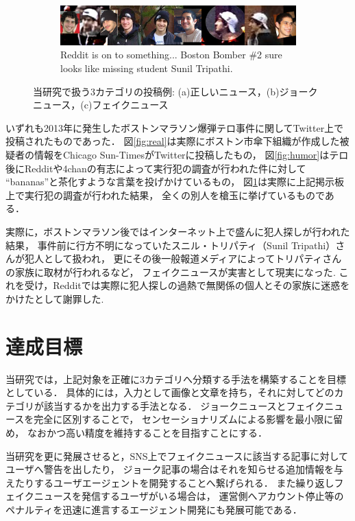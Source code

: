 \begin{figure}[ht]
\begin{subfigure}[b]{\textwidth}
        \includegraphics[width=\textwidth]{images/fake_example_boston.jpg}
        \caption{Reddit is on to something... Boston Bomber \#2 sure looks like missing student Sunil Tripathi. }
        \label{fig:fake}
    \end{subfigure}
    \caption{当研究で扱う3カテゴリの投稿例: (a)正しいニュース，(b)ジョークニュース，(c)フェイクニュース}
    \label{fig:examples}
\end{figure}

いずれも2013年に発生したボストンマラソン爆弾テロ事件に関してTwitter上で投稿されたものであった．
図\ref{fig:real}は実際にボストン市傘下組織が作成した被疑者の情報をChicago Sun-TimesがTwitterに投稿したもの，
図\ref{fig:humor}はテロ後にRedditや4chanの有志によって実行犯の調査が行われた件に対して
``bananas''と茶化すような言葉を投げかけているもの，
図\ref{fig:fake}は実際に上記掲示板上で実行犯の調査が行われた結果，
全くの別人を槍玉に挙げているものである．

実際に，ボストンマラソン後ではインターネット上で盛んに犯人探しが行われた結果，
事件前に行方不明になっていたスニル・トリパティ（Sunil Tripathi）さんが犯人として扱われ，
更にその後一般報道メディアによってトリパティさんの家族に取材が行われるなど，
フェイクニュースが実害として現実になった\cite{gray_2013}.
これを受け，Redditでは実際に犯人探しの過熱で無関係の個人とその家族に迷惑をかけたとして謝罪した\cite{laird_2013}.

%
\section{達成目標}
当研究では，上記対象を正確に3カテゴリへ分類する手法を構築することを目標としている．
具体的には，入力として画像と文章を持ち，それに対してどのカテゴリが該当するかを出力する手法となる．
ジョークニュースとフェイクニュースを完全に区別することで，
センセーショナリズムによる影響を最小限に留め，
なおかつ高い精度を維持することを目指すことにする．

当研究を更に発展させると，SNS上でフェイクニュースに該当する記事に対してユーザへ警告を出したり，
ジョーク記事の場合はそれを知らせる追加情報を与えたりするユーザエージェントを開発することへ繋げられる．
また繰り返しフェイクニュースを発信するユーザがいる場合は，
運営側へアカウント停止等のペナルティを迅速に進言するエージェント開発にも発展可能である．

%